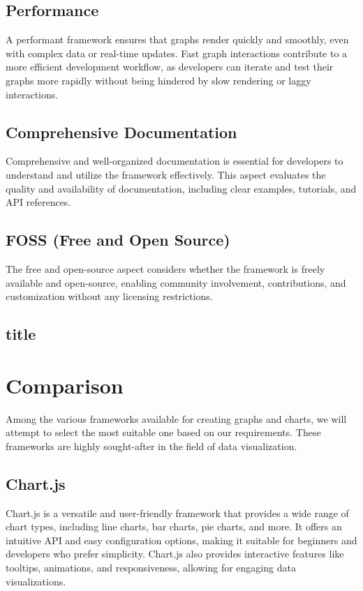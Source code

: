 \documentclass[a4paper, 11pt]{article}
\begin{document}
    \subsection{Performance}
    A performant framework ensures that graphs render quickly and smoothly, even with complex data or real-time updates. Fast graph interactions contribute to a more efficient development workflow, as developers can iterate and test their graphs more rapidly without being hindered by slow rendering or laggy interactions.
    \subsection{Comprehensive Documentation}
    Comprehensive and well-organized documentation is essential for developers to understand and utilize the framework effectively. This aspect evaluates the quality and availability of documentation, including clear examples, tutorials, and API references.
    \subsection{FOSS (Free and Open Source)}
    The free and open-source aspect considers whether the framework is freely available and open-source, enabling community involvement, contributions, and customization without any licensing restrictions.
    \medbreak
    \subsection[short]{title}
    
    
\section{Comparison}

Among the various frameworks available for creating graphs and charts, we will attempt to select the most suitable one based on our requirements. These frameworks are highly sought-after in the field of data visualization.

\subsection{Chart.js}
Chart.js is a versatile and user-friendly framework that provides a wide range of chart types, including line charts, bar charts, pie charts, and more. It offers an intuitive API and easy configuration options, making it suitable for beginners and developers who prefer simplicity. Chart.js also provides interactive features like tooltips, animations, and responsiveness, allowing for engaging data visualizations.\par
\medbreak
\end{document}
